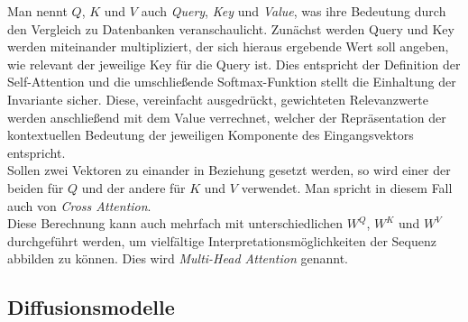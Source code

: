 Man nennt $Q$, $K$ und $V$ auch \textit{Query}, \textit{Key} und \textit{Value}, was ihre Bedeutung durch den Vergleich zu Datenbanken veranschaulicht. Zunächst werden Query und Key werden miteinander multipliziert, der sich hieraus ergebende Wert soll angeben, wie relevant der jeweilige Key für die Query ist. Dies entspricht der Definition der Self-Attention und die umschließende Softmax-Funktion stellt die Einhaltung der Invariante sicher. Diese, vereinfacht ausgedrückt, gewichteten Relevanzwerte werden anschließend mit dem Value verrechnet, welcher der Repräsentation der kontextuellen Bedeutung der jeweiligen Komponente des Eingangsvektors entspricht. \\
Sollen zwei Vektoren zu einander in Beziehung gesetzt werden, so wird einer der beiden für $Q$ und der andere für $K$ und $V$ verwendet. Man spricht in diesem Fall auch von \textit{Cross Attention}. \\
Diese Berechnung kann auch mehrfach mit unterschiedlichen $W^Q$, $W^K$ und $W^V$ durchgeführt werden, um vielfältige Interpretationsmöglichkeiten der Sequenz abbilden zu können. Dies wird \textit{Multi-Head Attention} genannt.

\subsection{Diffusionsmodelle}
\label{subsec:Grundlagen_DMs}

